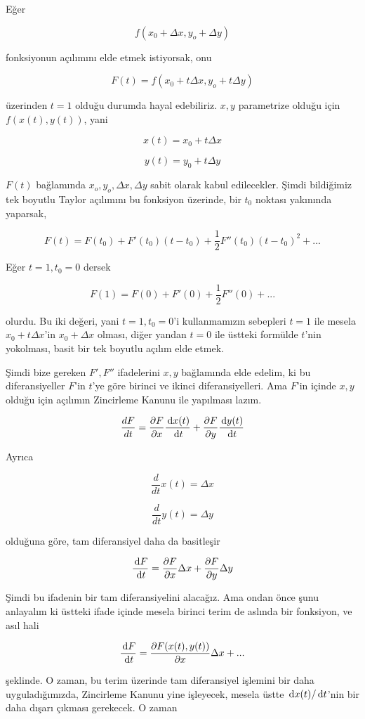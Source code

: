 \documentclass[12pt,fleqn]{article}\usepackage{../../common}
\begin{document}
Eğer 

$$ f(x_0 +\Delta x, y_o + \Delta y) $$

fonksiyonun açılımını elde etmek istiyorsak, onu

$$ F(t) = f(x_0 + t\Delta x, y_o + t\Delta y) $$

üzerinden $t=1$ olduğu durumda hayal edebiliriz. $x,y$ parametrize 
olduğu için  $f(x(t),y(t))$, yani

$$ x(t) = x_0 + t\Delta x $$

$$ y(t) = y_0 + t\Delta y $$

$F(t)$ bağlamında $x_o, y_o, \Delta x, \Delta y$ sabit olarak kabul edilecekler. 
Şimdi bildiğimiz
tek boyutlu Taylor açılımını bu fonksiyon üzerinde, bir $t_0$ noktası yakınında 
yaparsak,

$$ F(t) = F(t_0) + F'(t_0)(t-t_0) + \frac{1}{2}F''(t_0)(t-t_0)^2 + ... $$

Eğer $t=1,t_0=0$ dersek

$$ F(1) = F(0) + F'(0) + \frac{1}{2}F''(0) + ... $$

olurdu. Bu iki değeri, yani $t=1,t_0=0$'i kullanmamızın sebepleri $t=1$ ile
mesela $x_0 + t\Delta x$'in $x_0 + \Delta x$ olması, diğer yandan $t=0$ ile
üstteki formülde $t$'nin yokolması, basit bir tek boyutlu açılım elde
etmek.

Şimdi bize gereken $F',F''$ ifadelerini $x,y$ bağlamında elde edelim, ki bu
diferansiyeller $F$'in $t$'ye göre birinci ve ikinci diferansiyelleri. Ama
$F$'in içinde $x,y$ olduğu için açılımın Zincirleme Kanunu ile yapılması
lazım.

$$ \frac{dF}{dt} = \frac{\partial F}{\partial x}\frac{\,\mathrm{d} x(t)}{\,\mathrm{d} t} +
\frac{\partial F}{\partial y}\frac{\,\mathrm{d} y(t)}{\,\mathrm{d} t} 
 $$

Ayrıca

$$ \frac{d}{dt}x(t) = \Delta x $$

$$ \frac{d}{dt}y(t) = \Delta y $$

olduğuna göre, tam diferansiyel daha da basitleşir

$$ \frac{\,\mathrm{d} F}{\,\mathrm{d} t} = \frac{\partial F}{\partial x}\Delta x +
\frac{\partial F}{\partial y}\Delta y
$$

Şimdi bu ifadenin bir tam diferansiyelini alacağız. Ama ondan önce şunu
anlayalım ki üstteki ifade içinde mesela birinci terim de aslında bir
fonksiyon, ve asıl hali

$$ \frac{\,\mathrm{d} F}{\,\mathrm{d} t} = \frac{\partial F(x(t),y(t))}{\partial x}\Delta x + ...
 $$

şeklinde. O zaman, bu terim üzerinde tam diferansiyel işlemini bir daha
uyguladığımızda, Zincirleme Kanunu yine işleyecek, mesela üstte $\,\mathrm{d} x(t)/ \,\mathrm{d}
t$'nin bir daha dışarı çıkması gerekecek. O zaman
\end{document}
